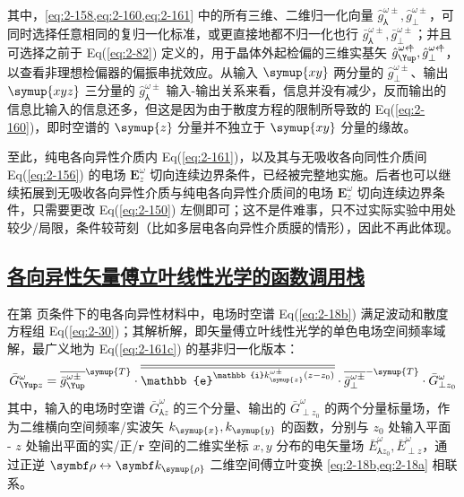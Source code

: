 其中，\cref{eq:2-158,eq:2-160,eq:2-161} 中的所有三维、二维归一化向量 $\hat{g}^{\omega\pm}_{\Yup}, \hat{g}^{\omega\pm}_{\perp}$，可同时选择任意相同的复归一化标准，或更直接地都不归一化也行 $\bar{g}^{\omega\pm}_{\Yup}, \bar{g}^{\omega\pm}_{\perp}$；并且可选择之前于 Eq(\ref{eq:2-82}) 定义的，用于晶体外起检偏的三维实基矢 $\hat{g}^{\omega \leftarrow\hspace{-0.525em}\uparrow}_{\Yup}, \hat{g}^{\omega \leftarrow\hspace{-0.525em}\uparrow}_{\perp}$，以查看非理想检偏器的偏振串扰效应\cite{zhangNonparaxialIdealizedPolarizer2018}。从输入 $\symup{xy}$ 两分量的 $\hat{g}^{\omega\pm}_{\perp}$、输出 $\symup{xyz}$ 三分量的 $\hat{g}^{\omega\pm}_{\Yup}$ 输入-输出关系来看，信息并没有减少，反而输出的信息比输入的信息还多，但这是因为由于散度方程的限制所导致的 Eq(\ref{eq:2-160})，即时空谱的 $\symup{z}$ 分量并不独立于 $\symup{xy}$ 分量的缘故。

至此，纯电各向异性介质内 Eq(\ref{eq:2-161})，以及其与无吸收各向同性介质间 Eq(\ref{eq:2-156}) 的电场 $\symbf E^{\omega}_z$ 切向连续边界条件，已经被完整地实施。后者也可以继续拓展到无吸收各向异性介质与纯电各向异性介质间的电场 $\symbf E^{\omega}_z$ 切向连续边界条件，只需要更改 Eq(\ref{eq:2-150}) 左侧即可；这不是件难事，只不过实际实验中用处较少/局限，条件较苛刻（比如多层电各向异性介质膜的情形），因此不再此体现。

\subsection{\protect\hyperlink{chap:\thesubsection}{各向异性矢量傅立叶线性光学的函数调用栈}}
\label{各向异性矢量傅立叶线性光学的函数调用栈}

在第 \pageref{con:1} 页条件下的电各向异性材料中，电场时空谱 Eq(\ref{eq:2-18b}) 满足波动和散度方程组 Eq(\ref{eq:2-30})；其解析解，即矢量傅立叶线性光学的单色电场空间频率域解，最广义地为 Eq(\ref{eq:2-161c}) 的基非归一化版本：
\begin{equation} \label{eq:2-162}
	\abovedisplayskip=10pt
	\belowdisplayskip=10pt
		\bar{G}^{\omega}_{\Yup z} = \overline{\bar{g}^{\omega\pm}_{\Yup}}^{\symup{T}} \cdot \overline{\overline{\mathbb{e}^{ \mathbb{i} k^{\omega\pm}_{\symup{z}} \left( z - z_0 \right)}}} \cdot \overline{\bar{g}^{\omega\pm}_{\perp}}^{-\symup{T}} \cdot \bar{G}^{\omega}_{\perp z_0}
\end{equation}
其中，输入的电场时空谱 $\bar{G}^{\omega}_{\Yup z}$ 的三个分量、输出的 $\bar{G}^{\omega}_{\perp z_0}$ 的两个分量标量场，作为二维横向空间频率/实波矢 $k_{\symup{x}},k_{\symup{y}}$ 的函数，分别与 $z_0$ 处输入平面 - $z$ 处输出平面的实/正/$\symbf{r}$ 空间的二维实坐标 $x,y$ 分布的电矢量场 $\bar{E}^{\omega}_{\Yup z_0}, \bar{E}^{\omega}_{\perp z}$，通过正逆 $\symbf \rho \leftrightarrow \symbf k_{\symup{\rho}}$ 二维空间傅立叶变换 \cref{eq:2-18b,eq:2-18a} 相联系。

